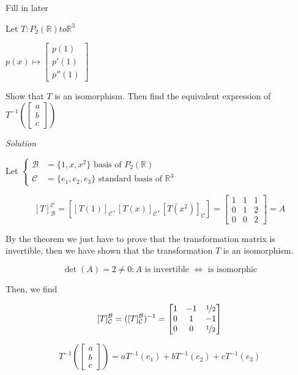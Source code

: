 \begin{tcolorbox}
	Fill in later
\end{tcolorbox}

\begin{example}
	Let $T: P_2(\mathbb{R}) to \mathbb{R}^3$
	
	$p(x) \mapsto \begin{bmatrix}
		p(1)\\p'(1)\\p''(1)
	\end{bmatrix}$

	Show that $T$ is an isomorphism. Then find the equivalent expression of $T^{-1}\left(\begin{bmatrix}
		a\\b\\c
	\end{bmatrix}\right)$

	\textit{Solution}

	Let
	$\begin{cases}
		\mathcal{B} &= \{1,x,x^2\} \text{ basis of } P_2(\mathbb{R})\\
		\mathcal{C} &= \{e_1, e_2, e_3\} \text{ standard basis of } \mathbb{R}^3
	\end{cases}$

	\[[T]_\mathcal{B}^\mathcal{C} = \left[[T(1)]_\mathcal{C}, [T(x)]_\mathcal{C}, [T(x^2)]_\mathcal{C}\right] = \begin{bmatrix}
		1&1&1\\0&1&2\\0&0&2
	\end{bmatrix} = A\]

	By the theorem we just have to prove that the transformation matrix is invertible, then we have shown that the transformation $T$ is an isomorphism.

	\[\det(A) = 2 \neq 0 : A \text{ is invertible } \iff \text{ is isomorphic}\]

	Then, we find 

	\[[T]_\mathcal{C}^\mathcal{B} = ([T]_\mathcal{C}^\mathcal{B})^{-1} = \begin{bmatrix}
		1&-1&\nicefrac{1}{2}\\
		0&1&-1\\
		0&0&\nicefrac{1}{2}
	\end{bmatrix}\]

	\[T^{-1}\left(\begin{bmatrix}
		a\\b\\c
	\end{bmatrix}\right) = a T^{-1}(e_1) + b T^{-1}(e_2) + c T^{-1}(e_3)\]


\end{example}
